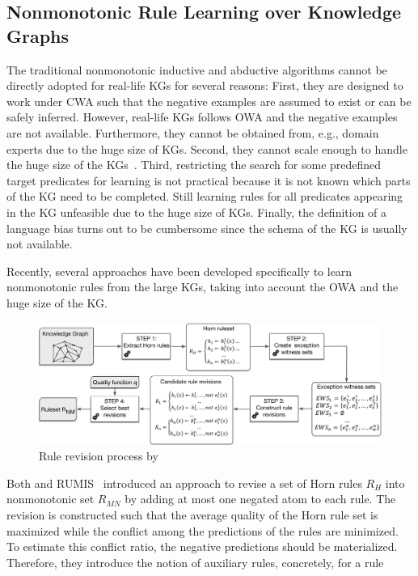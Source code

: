 \subsection{Nonmonotonic Rule Learning over Knowledge Graphs}
The traditional nonmonotonic inductive and abductive algorithms cannot be directly adopted for real-life KGs for several reasons:
First, they are designed to work under CWA such that the negative examples are assumed to exist or can be safely inferred. However, real-life KGs follows OWA and the negative examples are not available. Furthermore, they cannot be obtained from, e.g., domain experts due to the huge size of KGs.
Second, they cannot scale enough to handle the huge size of the KGs~\cite{Shakerin2018}. 
Third, restricting the search for some predefined target predicates for learning is not practical because
it is not known which parts of the KG need to be completed. Still learning rules for all predicates appearing in the KG unfeasible due to the huge
size of KGs. Finally,
the definition of a language bias turns out to be cumbersome since the schema of the
KG is usually not available.

Recently, several approaches have been developed specifically to learn nonmonotonic rules from the large KGs, taking into account the OWA and the huge size of the KG.

\begin{figure}[t]
\centering
\includegraphics[width=\textwidth]{figures/overview}
\caption{Rule revision process by~\cite{gad2016,rumis}}
\label{fig:iswc_process}
\end{figure}
Both \cite{gad2016} and RUMIS~\cite{rumis} introduced an approach to revise a set of Horn rules $R_H$ into nonmonotonic set $R_{MN}$ by adding at most one negated atom to each rule. The revision is constructed such that the average quality of the Horn rule set is maximized while the conflict among the predictions of the rules are minimized. To estimate this conflict ratio, the negative predictions should be materialized. Therefore, they introduce the notion of auxiliary rules, concretely, for a rule 

